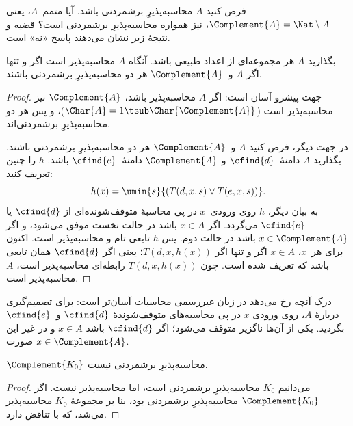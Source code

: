 \documentclass[../../../include/open-logic-section]{subfiles}
\begin{document}

فرض کنید $A$ محاسبه‌پذیرِ برشمردنی باشد. آیا متمم~$A$، یعنی
$\Complement{A}=\Nat\setminus A$، نیز همواره محاسبه‌پذیرِ برشمردنی
است؟ قضیه و نتیجهٔ زیر نشان می‌دهند پاسخ «نه» است.

\begin{thm}
بگذارید $A$ هر مجموعه‌ای از اعداد طبیعی باشد. آنگاه $A$ محاسبه‌پذیر
است اگر و تنها اگر $A$ و~$\Complement{A}$ هر دو محاسبه‌پذیرِ
برشمردنی باشند.
\end{thm}

\begin{proof}
جهت پیشرو آسان است: اگر $A$ محاسبه‌پذیر باشد، $\Complement{A}$ نیز
محاسبه‌پذیر است
($\Char{A}=1\tsub\Char{\Complement{A}}$)، و پس هر دو محاسبه‌پذیرِ
برشمردنی‌اند.

در جهت دیگر، فرض کنید $A$ و~$\Complement{A}$ هر دو محاسبه‌پذیرِ
برشمردنی باشند. بگذارید $A$ دامنهٔ~$\cfind{d}$ و $\Complement{A}$
دامنهٔ~$\cfind{e}$ باشد. $h$ را چنین تعریف کنید:
\[
h(x) = \umin{s}{(T(d,x,s) \lor T(e,x,s))}.
\]
به بیان دیگر، $h$ روی ورودی~$x$ در پی محاسبهٔ متوقف‌شونده‌ای از
$\cfind{d}$ یا $\cfind{e}$ می‌گردد. اگر $x\in A$ باشد در حالت نخست
موفق می‌شود، و اگر $x\in\Complement{A}$ باشد در حالت دوم. پس $h$
تابعی تام و محاسبه‌پذیر است. اکنون برای هر~$x$، $x\in A$ اگر و تنها
اگر $T(d,x,h(x))$؛ یعنی اگر $\cfind{d}$ همان تابعی باشد که تعریف شده
است. چون $T(d,x,h(x))$ رابطه‌ای محاسبه‌پذیر است، $A$ محاسبه‌پذیر است.
\end{proof}

\begin{explain}
درک آنچه رخ می‌دهد در زبان غیررسمی محاسبات آسان‌تر است: برای
تصمیم‌گیری دربارهٔ $A$، روی ورودی $x$ در پی محاسبه‌های متوقف‌شوندهٔ
$\cfind{d}$ و~$\cfind{e}$ بگردید. یکی از آن‌ها ناگزیر متوقف می‌شود؛
اگر $\cfind{d}$ باشد $x\in A$ و در غیر این صورت
$x\in\Complement{A}$.
\end{explain}

\begin{cor}
$\Complement{K_0}$ محاسبه‌پذیرِ برشمردنی نیست.
\end{cor}

\begin{proof}
می‌دانیم $K_0$ محاسبه‌پذیرِ برشمردنی است، اما محاسبه‌پذیر نیست. اگر
$\Complement{K_0}$ محاسبه‌پذیرِ برشمردنی بود، بنا بر
 مجموعهٔ $K_0$ محاسبه‌پذیر می‌شد، که با
 تناقض دارد.
\end{proof}
\end{document}
